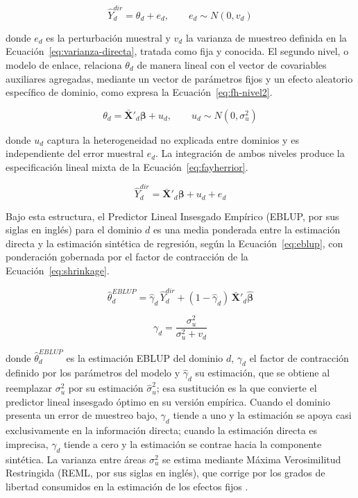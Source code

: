\begin{equation}
    \hat{Y}_d^{dir} = \theta_d + e_d, \qquad e_d \sim N(0, v_d)
    \label{eq:fh-nivel1}
\end{equation}

\noindent donde $e_d$ es la perturbación muestral y $v_d$ la varianza de muestreo definida en la Ecuación~\ref{eq:varianza-directa}, tratada como fija y conocida. El segundo nivel, o modelo de enlace, relaciona $\theta_d$ de manera lineal con el vector de covariables auxiliares agregadas, mediante un vector de parámetros fijos y un efecto aleatorio específico de dominio, como expresa la Ecuación~\ref{eq:fh-nivel2}.

\begin{equation}
    \theta_d = \bar{\mathbf{X}}'_d \boldsymbol{\beta} + u_d, \qquad u_d \sim N(0, \sigma^2_u)
    \label{eq:fh-nivel2}
\end{equation}

\noindent donde $u_d$ captura la heterogeneidad no explicada entre dominios y es independiente del error muestral $e_d$. La integración de ambos niveles produce la especificación lineal mixta de la Ecuación~\ref{eq:fayherrior}.

\begin{equation}
    \hat{Y}_d^{dir} = \bar{\mathbf{X}}'_d \boldsymbol{\beta} + u_d + e_d
    \label{eq:fayherrior}
\end{equation}

Bajo esta estructura, el Predictor Lineal Insesgado Empírico (EBLUP, por sus siglas en inglés) para el dominio $d$ es una media ponderada entre la estimación directa y la estimación sintética de regresión, según la Ecuación~\ref{eq:eblup}, con ponderación gobernada por el factor de contracción de la Ecuación~\ref{eq:shrinkage}.

\begin{equation}
    \hat{\theta}_d^{EBLUP} = \hat{\gamma}_d\, \hat{Y}_d^{dir} + (1 - \hat{\gamma}_d)\, \bar{\mathbf{X}}'_d \hat{\boldsymbol{\beta}}
    \label{eq:eblup}
\end{equation}

\begin{equation}
    \gamma_d = \frac{\sigma^2_u}{\sigma^2_u + v_d}
    \label{eq:shrinkage}
\end{equation}

\noindent donde $\hat{\theta}_d^{EBLUP}$ es la estimación EBLUP del dominio $d$, $\gamma_d$ el factor de contracción definido por los parámetros del modelo y $\hat{\gamma}_d$ su estimación, que se obtiene al reemplazar $\sigma^2_u$ por su estimación $\hat{\sigma}^2_u$; esa sustitución es la que convierte el predictor lineal insesgado óptimo en su versión empírica. Cuando el dominio presenta un error de muestreo bajo, $\gamma_d$ tiende a uno y la estimación se apoya casi exclusivamente en la información directa; cuando la estimación directa es imprecisa, $\gamma_d$ tiende a cero y la estimación se contrae hacia la componente sintética. La varianza entre áreas $\sigma^2_u$ se estima mediante Máxima Verosimilitud Restringida (REML, por sus siglas en inglés), que corrige por los grados de libertad consumidos en la estimación de los efectos fijos \cite{RaoMolina_2015}.

